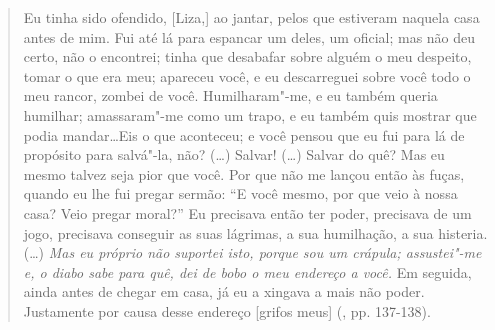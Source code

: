 \begin{quote}
Eu tinha sido ofendido, {[}Liza,{]} ao jantar, pelos que estiveram
naquela casa antes de mim. Fui até lá para espancar um deles, um
oficial; mas não deu certo, não o encontrei; tinha que desabafar sobre
alguém o meu despeito, tomar o que era meu; apareceu você, e eu
descarreguei sobre você todo o meu rancor, zombei de você.
Humilharam"-me, e eu também queria humilhar; amassaram"-me como um trapo,
e eu também quis mostrar que podia mandar\ldots Eis o que aconteceu; e você
pensou que eu fui para lá de propósito para salvá"-la, não? (\ldots) Salvar!
(\ldots) Salvar do quê? Mas eu mesmo talvez seja pior que você. Por que não
me lançou então às fuças, quando eu lhe fui pregar sermão: ``E você
mesmo, por que veio à nossa casa? Veio pregar moral?'' Eu precisava
então ter poder, precisava de um jogo, precisava conseguir as suas
lágrimas, a sua humilhação, a sua histeria. (\ldots) \emph{Mas eu próprio
não suportei isto, porque sou um crápula; assustei"-me e, o diabo sabe
para quê, dei de bobo o meu endereço a você.} Em seguida, ainda antes de
chegar em casa, já eu a xingava a mais não poder. Justamente por causa
desse endereço {[}grifos meus{]} (, pp. 137-138).
\end{quote}

